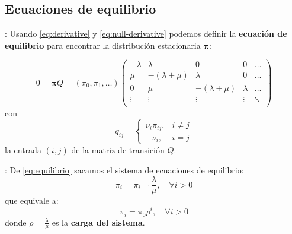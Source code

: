 \documentclass[xcolor={x11names}]{beamer}
\begin{document}
\subsection{Ecuaciones de equilibrio}

\begin{frame}{\secname: \subsecname}
    Usando \eqref{eq:derivative}
    y \eqref{eq:null-derivative} podemos
    definir la \textbf{ecuación de equilibrio}
    para encontrar la distribución estacionaria
    $\pmb{\pi}$:

    \begin{equation}
        0 = \pmb{\pi}Q = 
        (\pi_0, \pi_1, \ldots)
        \begin{pmatrix}
            -\lambda & \lambda & 0 & 0 & \ldots \\
            \mu & -(\lambda+\mu) & \lambda & 0 & \ldots \\
            0  & \mu & -(\lambda+\mu) & \lambda &  \ldots \\
            \vdots  & \vdots & \vdots & \vdots &  \ddots \\
        \end{pmatrix}
        \label{eq:equilibrio}
    \end{equation}
    con
    \begin{equation}
        q_{ij}=
        \begin{cases}
            \nu_i \pi_{i j}, & i\neq j\\
            -\nu_i, & i=j
        \end{cases}
    \end{equation}
    la entrada
    $(i,j)$ de la matriz de transición $Q$.

\end{frame}






\begin{frame}{\secname: \subsecname}
    De \eqref{eq:equilibrio} sacamos
    el sistema de ecuaciones de equilibrio:
    \begin{equation}
        \pi_i = \pi_{i-1} \frac{\lambda}{\mu},
        \quad \forall i>0
        \label{eq:sistema_equilibrio}
    \end{equation}
    que equivale a:
    \begin{equation}
        \pi_i = \pi_0 \rho^i, \quad \forall i>0
        \label{eq:sistema_equilibrio-potencia}
    \end{equation}
    donde $\rho=\tfrac{\lambda}{\mu}$
    es la \textbf{carga del sistema}.
\end{frame}
\end{document}
